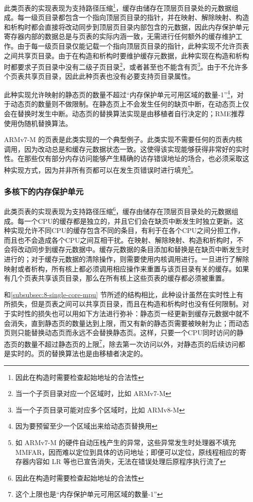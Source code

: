 此类页表的实现表现为支持路径压缩\footnote{因此在构造时需要检查起始地址的合法性}，缓存由储存在顶层页目录处的元数据组成。每一级页目录都包含一个指向顶层页目录的指针，并在映射、解除映射、构造和析构时都会直接将改动同步到顶层页目录内部包含的元数据，因此内存保护单元寄存器内部的数据总是与页表的实际内涵一致，无需进行任何额外的缓存维护工作。由于每一级页目录仅能记载一个指向顶层页目录的指针，此种实现不允许页表之间共享页目录。由于在构造和析构时要维护缓存元数据，此种实现在构造和析构时都要求子页目录中没有二级子页目录\footnote{当一个子页目录对应一个区域时，比如 ARMv7-M}，或者甚至也不能含有页\footnote{当一个子页目录可能对应多个区域时，比如 ARMv8-M}。由于不允许多个页表共享页目录，因此此种页表也没有必要支持页目录属性。

此种实现允许映射的静态页的数量不超过``内存保护单元可用区域的数量-1''\footnote{因为要预留至少一个区域出来给动态页替换用}，对于动态页的数量则不做限制。在静态页上不会发生任何的缺页中断，在动态页上仅会在替换时发生中断。动态页的替换算法实现是由移植者自行决定的；RME推荐使用伪随机替换算法。

ARMv7-M 的页表是此类实现的一个典型例子。此类实现不需要任何的页表内核调用，因为改动总是和缓存元数据状态一致。这使得该实现能够获得非常好的实时性。在那些仅有部分内存访问能够产生精确的访存错误地址的场合，也必须采取这种实现方式，因为并非所有页都可以在发生页错误时进行填充\footnote{如 ARMv7-M 的硬件自动压栈产生的异常，这些异常发生时处理器不填充 MMFAR，因而难以定位到具体的访问地址；即便可以定位，原线程相应的寄存器内容如 LR 等也已宣告消失，无法在错误处理后原程序执行流了}。

\subsubsection{多核下的内存保护单元}\label{subsubsec:8-multi-core-mpu}

此类页表的实现表现为支持路径压缩\footnote{因此在构造时需要检查起始地址的合法性}，缓存由储存在顶层页目录处的元数据组成。每一个CPU的缓存都是独立的，并且它们会在缺页中断发生时独立更新。这种实现允许不同CPU的缓存包含不同的条目，有利于在各个CPU之间分担工作，而且也不会造成各个CPU之间互相干扰。在映射、解除映射、构造和析构时，不会将改动同步到缓存元数据中。缓存元数据的条目添加和替换是在缺页中断发生时进行的；对于缓存元数据的清除操作，则需要使用内核调用进行。一旦进行了解除映射或者析构，所有核上都必须调用相应操作来重置与该页目录有关的缓存。如果有几个页表共享该页目录，那么在所有核上这些页表的缓存都必须被重置。

和\ref{subsubsec:8-single-core-mpu}
节所述的结构相比，此种设计虽然在实时性上有所损失，但是页表之间可以共享页目录，而且在构造和析构时也没有任何限制。对于实时性的损失也可以用如下方法进行弥补：静态页一经更新到缓存元数据中就不会消失，直到静态页的数量达到上限，而又有新的静态页需要被映射为止；而动态页则只能替换动态页而永远不会替换静态页。这样，只要一个CPU同时访问的静态页的数量不超过静态页的上限\footnote{这个上限也是``内存保护单元可用区域的数量-1''}，除去第一次访问以外，对静态页的后续访问都是实时的。页的替换算法也是由移植者决定的。

